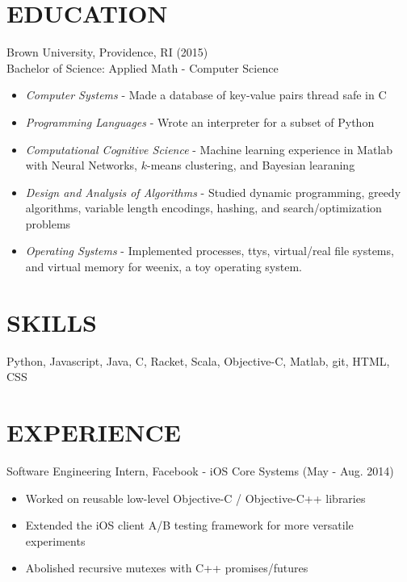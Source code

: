 \documentclass[11pt]{res} %
\begin{document}
\begin{resume}

\section{EDUCATION}
Brown University, Providence, RI (2015) \\
Bachelor of Science: Applied Math - Computer Science
\begin{itemize} \itemsep -2pt
  \item \emph{Computer Systems} - Made a database of key-value pairs thread safe in C
  \item \emph{Programming Languages} - Wrote an interpreter for a subset of Python
  \item \emph{Computational Cognitive Science} - Machine learning experience in Matlab with Neural Networks, $k$-means clustering, and Bayesian learaning
  \item \emph{Design and Analysis of Algorithms} - Studied dynamic programming, greedy algorithms, variable length encodings, hashing,  and search/optimization problems
  \item \emph{Operating Systems} - Implemented processes, ttys, virtual/real file systems, and virtual memory for weenix, a toy operating system.
\end{itemize}

 \section{SKILLS}
  Python, Javascript, Java, C, Racket, Scala, Objective-C, Matlab, git, HTML, CSS

\section{EXPERIENCE}
Software Engineering Intern,
Facebook - iOS Core Systems
(May - Aug. 2014)
\vspace{0.02in}
  \begin{itemize} \itemsep -2pt
  \item Worked on reusable low-level Objective-C / Objective-C++ libraries
  \item Extended the iOS client A/B testing framework for more versatile experiments
  \item Abolished recursive mutexes with C++ promises/futures
  \end{itemize}


\end{resume}
\end{document}
